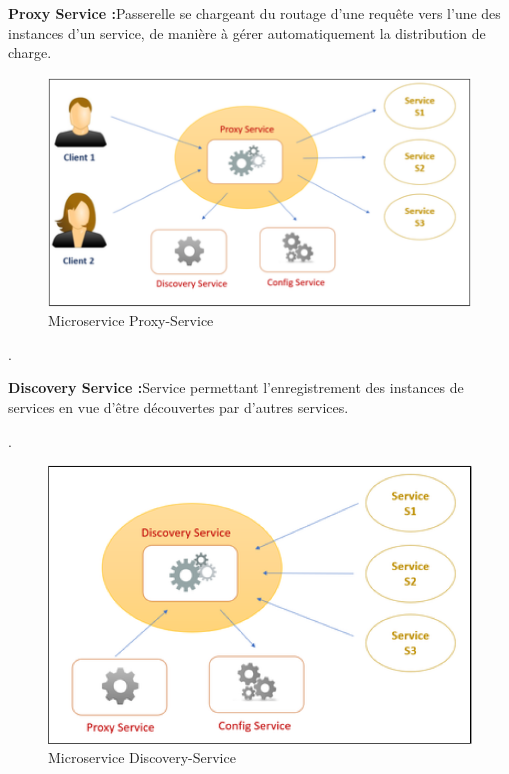                   \begin{itemize}[font=\normalsize]
                  \textbf{ Proxy Service :}Passerelle se chargeant du routage d'une requête vers l'une
des instances d'un service, de manière à gérer automatiquement la
distribution de charge.
                  \end{itemize} 
                   \begin{figure}[H]
        \centering
        \includegraphics[width=1\columnwidth,height=0.4
\columnwidth]{images/proxy.PNG}
        \caption{Microservice Proxy-Service}
        \end{figure}.
                  \begin{itemize}[font=\normalsize]
                  \textbf{ Discovery Service :}Service permettant l'enregistrement des instances de
services en vue d'être découvertes par d'autres services.
                  \end{itemize} .
                  \begin{figure}[H]
        \centering
        \includegraphics[width=1\columnwidth,height=0.4
\columnwidth]{images/discovery.PNG}
        \caption{Microservice Discovery-Service}
        \end{figure}

